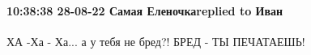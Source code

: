  
 
 
 
 

\paragraph{10:38:38 28-08-22 Самая Еленочкаreplied to Иван}

ХА -Ха - Ха... а у тебя не бред?! БРЕД - ТЫ ПЕЧАТАЕШЬ!
